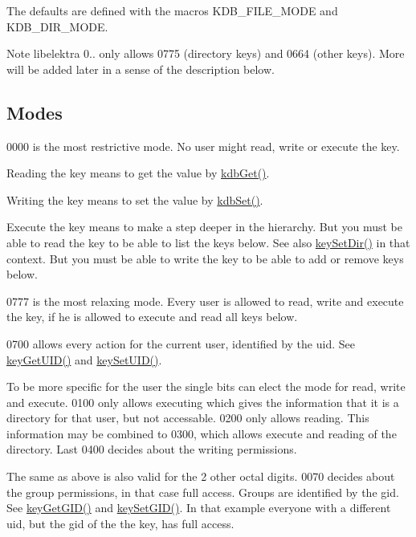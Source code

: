 The defaults are defined with the macros K\-D\-B\-\_\-\-F\-I\-L\-E\-\_\-\-M\-O\-D\-E and K\-D\-B\-\_\-\-D\-I\-R\-\_\-\-M\-O\-D\-E.

\begin{DoxyNote}{Note}
libelektra 0.. only allows 0775 (directory keys) and 0664 (other keys). More will be added later in a sense of the description below.
\end{DoxyNote}
\hypertarget{group__keymeta_mode}{}\subsection{Modes}\label{group__keymeta_mode}
0000 is the most restrictive mode. No user might read, write or execute the key.

Reading the key means to get the value by \hyperlink{group__kdb_ga28e385fd9cb7ccfe0b2f1ed2f62453a1}{kdb\-Get()}.

Writing the key means to set the value by \hyperlink{group__kdb_ga11436b058408f83d303ca5e996832bcf}{kdb\-Set()}.

Execute the key means to make a step deeper in the hierarchy. But you must be able to read the key to be able to list the keys below. See also \hyperlink{group__keymeta_gaae575bd86a628a15ee45baa860522e75}{key\-Set\-Dir()} in that context. But you must be able to write the key to be able to add or remove keys below.

0777 is the most relaxing mode. Every user is allowed to read, write and execute the key, if he is allowed to execute and read all keys below.

0700 allows every action for the current user, identified by the uid. See \hyperlink{group__keymeta_gacaa5060e67b03f50ae49a3620c54bc46}{key\-Get\-U\-I\-D()} and \hyperlink{group__keymeta_gab5f284f5ecd261e0a290095f50ba1af7}{key\-Set\-U\-I\-D()}.

To be more specific for the user the single bits can elect the mode for read, write and execute. 0100 only allows executing which gives the information that it is a directory for that user, but not accessable. 0200 only allows reading. This information may be combined to 0300, which allows execute and reading of the directory. Last 0400 decides about the writing permissions.

The same as above is also valid for the 2 other octal digits. 0070 decides about the group permissions, in that case full access. Groups are identified by the gid. See \hyperlink{group__keymeta_ga46a95e81d7d7f4e3eb59e60e5f3738c0}{key\-Get\-G\-I\-D()} and \hyperlink{group__keymeta_ga9e3d0fb3f7ba906e067727b9155d22e3}{key\-Set\-G\-I\-D()}. In that example everyone with a different uid, but the gid of the the key, has full access.


